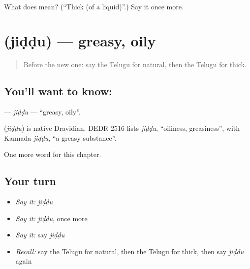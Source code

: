 \begin{tcolorbox}[breakable,colback=teal!4,colframe=teal!35!black,title={Before you move on}]
What does  mean? (\textquotedblleft{}Thick (of a liquid)\textquotedblright{}.) Say it once more.
\end{tcolorbox}
\section[\texorpdfstring{\te{జిడ్డు} (jiḍḍu)}{జిడ్డు (jiḍḍu)}]{ (jiḍḍu) — greasy, oily}

\label{lesson:TE-C261-jiddu}



\begin{quote}
Before the new one: say the Telugu for natural, then the Telugu for thick.
\end{quote}

\subsection*{You'll want to know: }
\textbf{} — \emph{jiḍḍu} — \textquotedblleft{}greasy, oily\textquotedblright{}.

\begin{cousinweb}
\textbf{} (\emph{jiḍḍu}) is native Dravidian. DEDR 2516 lists \emph{jiḍḍu}, \textquotedblleft{}oiliness, greasiness\textquotedblright{}, with Kannada \emph{jiḍḍu}, \textquotedblleft{}a greasy substance\textquotedblright{}.
\end{cousinweb}

\begin{grammarlens}[title={What you've built}]
One more word for this chapter.
\end{grammarlens}

\subsection*{Your turn}
\begin{itemize}
\raggedright
  \item \emph{Say it:} \emph{jiḍḍu}
  \item \emph{Say it:} \emph{jiḍḍu}, once more
  \item \emph{Say it:} say \emph{jiḍḍu}
  \item \emph{Recall:} say the Telugu for natural, then the Telugu for thick, then say \emph{jiḍḍu} again
\end{itemize}


